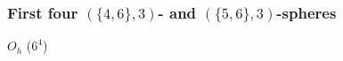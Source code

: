 \documentclass{beamer}
\begin{document}
\begin{frame}\frametitle{First four $(\{4,6\},3)$- and
$(\{5,6\},3)$-spheres}
\vspace{-1.5mm}

\begin{center}
\begin{minipage}[b]{24mm}
\centering
{}\par
$O_h$ ($6^4$)
\end{minipage}
\begin{minipage}[b]{25mm}
\centering
{}\par

\end{minipage}
\end{center}
\end{frame}
\end{document}

